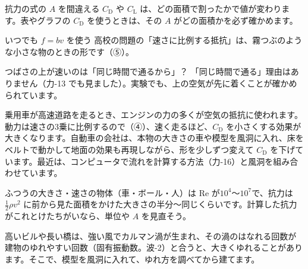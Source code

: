 \begin{tsumazuki}{抗力の式の $A$ を間違える}
$C_{\mathrm D}$ や $C_{\mathrm L}$ は、どの面積で割ったかで値が変わります。表やグラフの $C_{\mathrm D}$ を使うときは、その $A$ がどの面積かを必ず確かめます。
\end{tsumazuki}

\begin{tsumazuki}{いつでも $f=bv$ を使う}
高校の問題の「速さに比例する抵抗」は、霧つぶのような小さな物のときの形です（⑤）。
\end{tsumazuki}

\begin{tsumazuki}{つばさの上が速いのは「同じ時間で通るから」？}
「同じ時間で通る」理由はありません（力-13 でも見ました）。実験でも、上の空気が先に着くことが確かめられています。
\end{tsumazuki}

\begin{phkougaku}[車の空気の抵抗を減らす]
乗用車が高速道路を走るとき、エンジンの力の多くが空気の抵抗に使われます。動力は速さの3乗に比例するので（④）、速く走るほど、$C_{\mathrm D}$ を小さくする効果が大きくなります。自動車の会社は、本物の大きさの車や模型を風洞に入れ、床をベルトで動かして地面の効果も再現しながら、形を少しずつ変えて $C_{\mathrm D}$ を下げています。最近は、コンピュータで流れを計算する方法（力-16）と風洞を組み合わせています。
\begin{phketa}[空気の中の物体]
ふつうの大きさ・速さの物体（車・ボール・人）は Re が$10^4$〜$10^7$で、抗力は $\tfrac12\rho v^2$ に前から見た面積をかけた大きさの半分〜同じくらいです。計算した抗力がこれとけたちがいなら、単位や $A$ を見直そう。
\end{phketa}
高いビルや長い橋は、強い風でカルマン渦が生まれ、その渦のはなれる回数が建物のゆれやすい回数（固有振動数。波-2）と合うと、大きくゆれることがあります。そこで、模型を風洞に入れて、ゆれ方を調べてから建てます。
\end{phkougaku}

